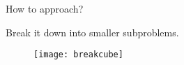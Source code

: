 \begin{frame}[label=conclusion, standout]
    \begin{center}
    \LARGE How to approach?
    \end{center}
\end{frame}

\begin{frame}
    \begin{center}
        \Large{Break it down into smaller subproblems.}
        
        \begin{figure}
            \texttt{[image: breakcube]}
        \end{figure}
    \end{center}
\end{frame}

